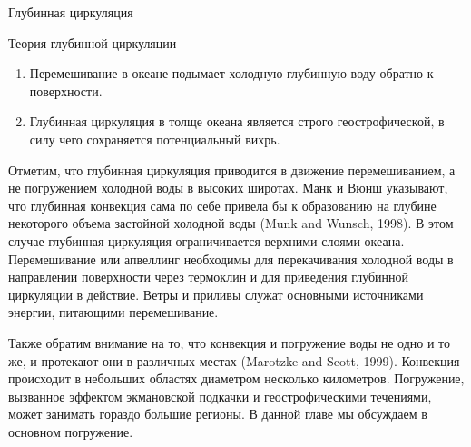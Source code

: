 \begin{chapter}{Глубинная циркуляция}
\begin{section}{Теория глубинной циркуляции}
\begin{enumerate}
\item 
Перемешивание в океане подымает
холодную глубинную воду обратно к поверхности.
%

\item 
Глубинная циркуляция в толще океана является строго 
геострофической, 
в силу чего сохраняется потенциальный вихрь.
%
\end{enumerate}

Отметим, что глубинная циркуляция приводится
в движение перемешиванием, а не погружением
холодной воды в высоких широтах. Манк и Вюнш указывают, что глубинная конвекция
сама по себе привела бы к образованию на глубине некоторого объема застойной
холодной воды (Munk and Wunsch, 1998). В этом случае глубинная циркуляция
ограничивается верхними слоями океана. Перемешивание или 
апвеллинг необходимы для перекачивания
холодной воды в направлении поверхности через 
термоклин
и для приведения глубинной циркуляции в действие. Ветры и приливы служат
основными источниками энергии, питающими 
перемешивание.
%

Также обратим внимание на то, что конвекция и погружение воды не одно и то же,
и протекают они в различных местах (Marotzke and Scott, 1999). Конвекция 
происходит в небольших областях диаметром несколько километров. Погружение,
вызванное эффектом экмановской подкачки 
и геострофическими течениями, может занимать гораздо большие регионы.
В данной главе мы обсуждаем в основном погружение.
%


\end{section}
\end{chapter}
